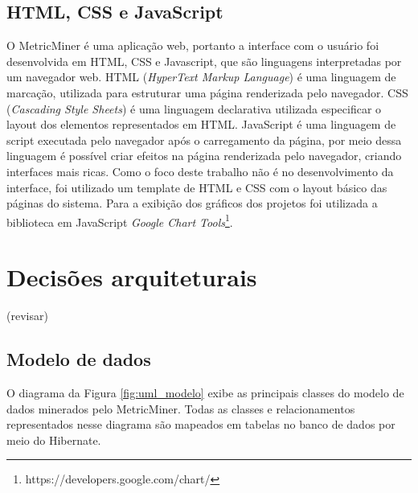 \documentclass[a4paper, 12pt, twoside]{book}
\begin{document}
        \subsection*{HTML, CSS e JavaScript}
            O MetricMiner é uma aplicação web, portanto a interface com o usuário foi desenvolvida em HTML, CSS e Javascript, que são linguagens interpretadas por um navegador web. HTML (\textit{HyperText Markup Language}) é uma linguagem de marcação, utilizada para estruturar uma página renderizada pelo navegador. CSS (\textit{Cascading Style Sheets}) é uma linguagem declarativa utilizada especificar o layout dos elementos representados em HTML. JavaScript é uma linguagem de script executada pelo navegador após o carregamento da página, por meio dessa linguagem é possível criar efeitos na página renderizada pelo navegador, criando interfaces mais ricas. Como o foco deste trabalho não é no desenvolvimento da interface, foi utilizado um template de HTML e CSS com o layout básico das páginas do sistema. Para a exibição dos gráficos dos projetos foi utilizada a biblioteca em JavaScript \textit{Google Chart Tools}\footnote{https://developers.google.com/chart/}.



    \section{Decisões arquiteturais} \label{sc:arquitetura}
    (revisar)

        \subsection*{Modelo de dados}
            O diagrama da Figura \ref{fig:uml_modelo} exibe as principais classes do modelo de dados minerados pelo MetricMiner. Todas as classes e relacionamentos representados nesse diagrama são mapeados em tabelas no banco de dados por meio do Hibernate. 
\end{document}
